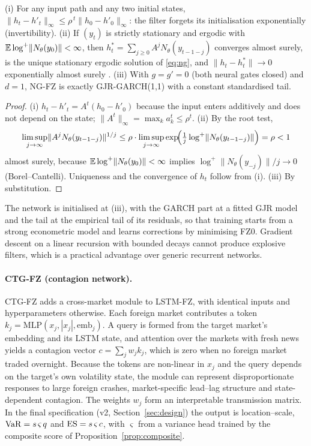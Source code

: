 \begin{proposition}\label{prop:ng}
(i) For any input path and any two initial states, $\lVert h_t-h'_t\rVert_\infty\le\rho^{\,t}\lVert h_0-h'_0\rVert_\infty$: the filter forgets its initialisation exponentially (invertibility).
(ii) If $(y_t)$ is strictly stationary and ergodic with $\mathbb{E}\log^+\lVert N_\theta(y_0)\rVert<\infty$, then $h^*_t=\sum_{j\ge0}A^jN_\theta(y_{t-1-j})$ converges almost surely, is the unique stationary ergodic solution of \eqref{eq:ng}, and $\lVert h_t-h^*_t\rVert\to0$ exponentially almost surely \citep{brandt1986stochastic,bougerol1993kalman}.
(iii) With $g=g'=0$ (both neural gates closed) and $d=1$, NG-FZ is exactly GJR-GARCH(1,1) with a constant standardised tail.
\end{proposition}
\begin{proof}
(i) $h_t-h'_t=A^t(h_0-h'_0)$ because the input enters additively and does not depend on the state; $\lVert A^t\rVert_\infty=\max_k a_k^t\le\rho^t$. (ii) By the root test,
\[
\limsup_{j\to\infty}\lVert A^jN_\theta(y_{t-1-j})\rVert^{1/j}\le\rho\cdot\limsup_{j\to\infty}\exp\!\Bigl(\tfrac{1}{j}\log^+\lVert N_\theta(y_{t-1-j})\rVert\Bigr)=\rho<1
\]
almost surely, because $\mathbb{E}\log^+\lVert N_\theta(y_0)\rVert<\infty$ implies $\log^+\lVert N_\theta(y_{-j})\rVert/j\to0$ (Borel--Cantelli). Uniqueness and the convergence of $h_t$ follow from (i). (iii) By substitution.
\end{proof}
The network is initialised at (iii), with the GARCH part at a fitted GJR model and the tail at the empirical tail of its residuals, so that training starts from a strong econometric model and learns corrections by minimising FZ0. Gradient descent on a linear recursion with bounded decays cannot produce explosive filters, which is a practical advantage over generic recurrent networks.

\paragraph{CTG-FZ (contagion network).} CTG-FZ adds a cross-market module to LSTM-FZ, with identical inputs and hyperparameters otherwise. Each foreign market contributes a token $k_j=\mathrm{MLP}(x_j,|x_j|,\mathrm{emb}_j)$. A query is formed from the target market's embedding and its LSTM state, and attention over the markets with fresh news yields a contagion vector $c=\sum_jw_jk_j$, which is zero when no foreign market traded overnight. Because the tokens are non-linear in $x_j$ and the query depends on the target's own volatility state, the module can represent disproportionate responses to large foreign crashes, market-specific lead--lag structure and state-dependent contagion. The weights $w_j$ form an interpretable transmission matrix. In the final specification (v2, Section~\ref{sec:design}) the output is location--scale, $\mathrm{VaR}=s\,\varsigma\,q$ and $\mathrm{ES}=s\,\varsigma\,c$, with $\varsigma$ from a variance head trained by the composite score of Proposition~\ref{prop:composite}.

